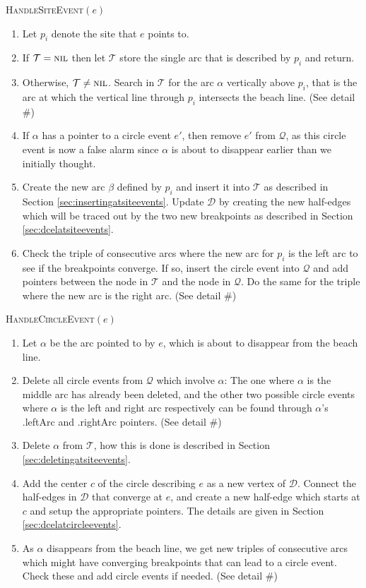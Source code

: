 \begin{proc} \textsc{HandleSiteEvent}$(e)$
\begin{enumerate}
    \item Let $p_i$ denote the site that $e$ points to.
    \item If $\mathcal{T} = \textsc{nil}$ then let $\mathcal{T}$ store the single arc that is described by $p_i$ and return.
    \item Otherwise, $\mathcal{T} \ne \textsc{nil}$. Search in $\mathcal{T}$ for the arc $\alpha$ vertically above $p_i$, that is the arc at which the vertical line through $p_i$ intersects the beach line. (See detail \#)
    \item If $\alpha$ has a pointer to a circle event $e'$, then remove $e'$ from $\mathcal{Q}$, as this circle event is now a false alarm since $\alpha$ is about to disappear earlier than we initially thought.
    \item Create the new arc $\beta$ defined by $p_i$ and insert it into $\mathcal{T}$ as described in Section \ref{sec:insertingatsiteevents}. Update $\mathcal{D}$ by creating the new half-edges which will be traced out by the two new breakpoints as described in Section \ref{sec:dcelatsiteevents}.
    \item Check the triple of consecutive arcs where the new arc for $p_i$ is the left arc to see if the breakpoints converge. If so, insert the circle event into $\mathcal{Q}$ and add pointers between the node in $\mathcal{T}$ and the node in $\mathcal{Q}$. Do the same for the triple where the new arc is the right arc. (See detail \#)
\end{enumerate}
\end{proc}

\begin{proc} \textsc{HandleCircleEvent}$(e)$
\begin{enumerate}
    \item Let $\alpha$ be the arc pointed to by $e$, which is about to disappear from the beach line.
    \item Delete all circle events from $\mathcal{Q}$ which involve $\alpha$: The one where $\alpha$ is the middle arc has already been deleted, and the other two possible circle events where $\alpha$ is the left and right arc respectively can be found through $\alpha$'s \textsf{.leftArc} and \textsf{.rightArc} pointers. (See detail \#)
    \item Delete $\alpha$ from $\mathcal{T}$, how this is done is described in Section \ref{sec:deletingatsiteevents}.
    \item Add the center $c$ of the circle describing $e$ as a new vertex of $\mathcal{D}$. Connect the half-edges in $\mathcal{D}$ that converge at $e$, and create a new half-edge which starts at $c$ and setup the appropriate pointers. The details are given in Section \ref{sec:dcelatcircleevents}.
    \item As $\alpha$ disappears from the beach line, we get new triples of consecutive arcs which might have converging breakpoints that can lead to a circle event. Check these and add circle events if needed. (See detail \#)
\end{enumerate}
\end{proc}

